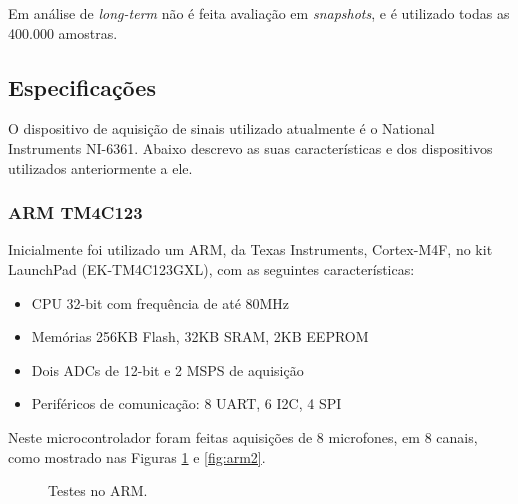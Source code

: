 \documentclass[a4paper,oneside,12pt]{article}
\begin{document}
Em análise de \emph{long-term} não é feita avaliação em \emph{snapshots}, e é utilizado todas as 400.000 amostras.

\subsection{Especificações}

O dispositivo de aquisição de sinais utilizado atualmente é o National Instruments NI-6361. Abaixo descrevo as suas características e dos dispositivos utilizados anteriormente a ele.

\subsubsection{ARM TM4C123}

Inicialmente foi utilizado um ARM, da Texas Instruments, Cortex-M4F, no kit LaunchPad (EK-TM4C123GXL), com as seguintes características:

\begin{itemize}
\item CPU 32-bit com frequência de até 80MHz
\item Memórias 256KB Flash, 32KB SRAM, 2KB EEPROM
\item Dois ADCs de 12-bit e 2 MSPS de aquisição
\item Periféricos de comunicação: 8 UART, 6 I2C, 4 SPI
\end{itemize}

Neste microcontrolador foram feitas aquisições de 8 microfones, em 8 canais, como mostrado nas Figuras \ref{fig:arm1} e \ref{fig:arm2}.

\begin{figure}
\centering
{}
\caption{Testes no ARM.}\label{fig:arm1}
\end{figure}
\end{document}
